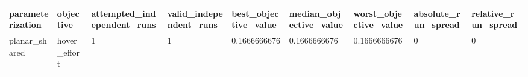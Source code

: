 \begin{tabular}{@{}lllllllll@{}}
\toprule
parameterization & objective & attempted\_independent\_runs & valid\_independent\_runs & best\_objective\_value & median\_objective\_value & worst\_objective\_value & absolute\_run\_spread & relative\_run\_spread \\
\midrule
planar\_shared & hover\_effort & 1 & 1 & 0.1666666676 & 0.1666666676 & 0.1666666676 & 0 & 0 \\
\bottomrule
\end{tabular}
